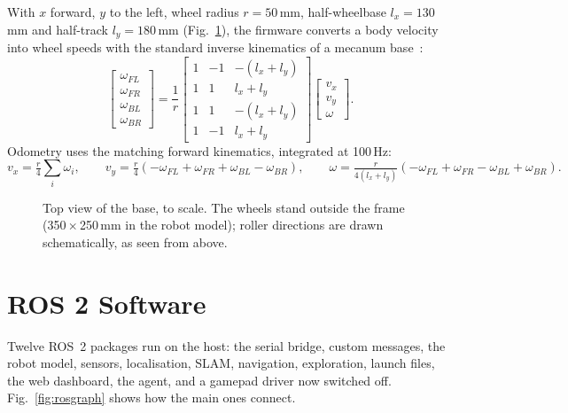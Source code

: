 \documentclass[11pt]{article}
\begin{document}
With $x$ forward, $y$ to the left, wheel radius $r = 50$\,mm, half-wheelbase $l_x = 130$\,mm and half-track $l_y = 180$\,mm (Fig.~\ref{fig:mecanum}), the firmware converts a body velocity into wheel speeds with the standard inverse kinematics of a mecanum base~\cite{muir1987kinematic}:
\begin{equation}
\begin{bmatrix} \omega_{FL} \\ \omega_{FR} \\ \omega_{BL} \\ \omega_{BR} \end{bmatrix}
= \frac{1}{r}
\begin{bmatrix} 1 & -1 & -(l_x + l_y) \\ 1 & 1 & l_x + l_y \\ 1 & 1 & -(l_x + l_y) \\ 1 & -1 & l_x + l_y \end{bmatrix}
\begin{bmatrix} v_x \\ v_y \\ \omega \end{bmatrix}.
\end{equation}
Odometry uses the matching forward kinematics, integrated at 100\,Hz:
\begin{equation}
v_x = \tfrac{r}{4}\textstyle\sum_i \omega_i, \qquad
v_y = \tfrac{r}{4}(-\omega_{FL} + \omega_{FR} + \omega_{BL} - \omega_{BR}), \qquad
\omega = \tfrac{r}{4(l_x+l_y)}(-\omega_{FL} + \omega_{FR} - \omega_{BL} + \omega_{BR}).
\end{equation}

\begin{figure}[htbp]
  \centering
  \caption{Top view of the base, to scale. The wheels stand outside the frame (350\,$\times$\,250\,mm in the robot model); roller directions are drawn schematically, as seen from above.}
  \label{fig:mecanum}
\end{figure}

\section{ROS 2 Software}
\label{sec:ros}

Twelve ROS~2 packages run on the host: the serial bridge, custom messages, the robot model, sensors, localisation, SLAM, navigation, exploration, launch files, the web dashboard, the agent, and a gamepad driver now switched off. Fig.~\ref{fig:rosgraph} shows how the main ones connect.
\end{document}
